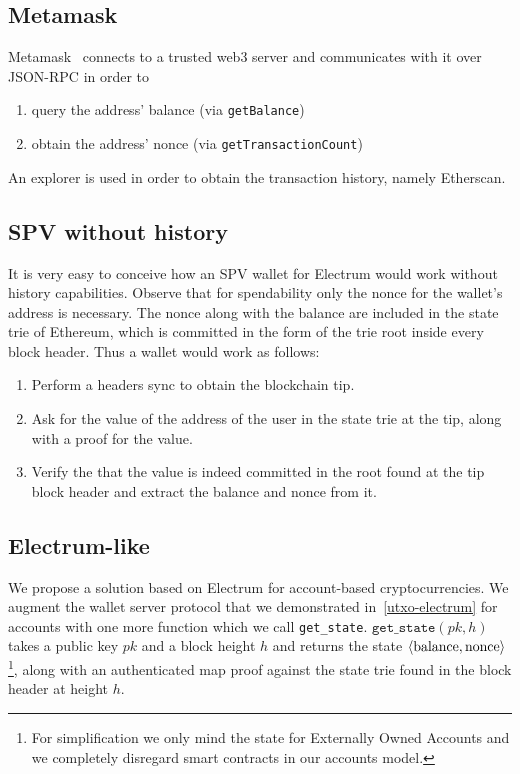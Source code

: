 \subsection{Metamask}
Metamask~\cite{metamask} connects to a trusted web3 server and communicates with it over JSON-RPC in order to
\begin{enumerate}
    \item query the address' balance (via \texttt{getBalance})
    \item obtain the address' nonce (via \texttt{getTransactionCount})
\end{enumerate}

An explorer is used in order to obtain the transaction history, namely Etherscan.

\subsection{SPV without history}
It is very easy to conceive how an SPV wallet for Electrum would work without history capabilities. Observe that for spendability only the nonce for the wallet's address is necessary. The nonce along with the balance are included in the state trie of Ethereum, which is committed in the form of the trie root inside every block header. Thus a wallet would work as follows:

\begin{enumerate}
    \item Perform a headers sync to obtain the blockchain tip.
    \item Ask for the value of the address of the user in the state trie at the tip, along with a proof for the value.
    \item Verify the that the value is indeed committed in the root found at the tip block header and extract the balance and nonce from it.
\end{enumerate}

\subsection{Electrum-like}
We propose a solution based on Electrum for account-based cryptocurrencies. We augment the wallet server protocol that we demonstrated in~\cref{utxo-electrum} for accounts with one more function which we call \texttt{get\_state}. $\texttt{get\_state}(pk, h)$ takes a public key $pk$ and a block height $h$ and returns the state $\langle\text{balance}, \text{nonce}\rangle$\footnote{For simplification we only mind the state for Externally Owned Accounts and we completely disregard smart contracts in our accounts model.}, along with an authenticated map proof against the state trie found in the block header at height $h$.

